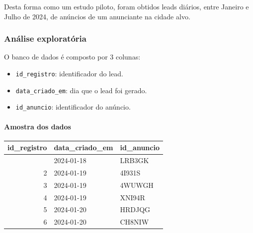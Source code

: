 \documentclass[
]{article}
\newenvironment{Shaded}{\begin{snugshade}}{\end{snugshade}}
\newcommand{\AttributeTok}[1]{\textcolor[rgb]{0.13,0.29,0.53}{#1}}
\newcommand{\FunctionTok}[1]{\textcolor[rgb]{0.13,0.29,0.53}{\textbf{#1}}}
\newcommand{\NormalTok}[1]{#1}
\newcommand{\OtherTok}[1]{\textcolor[rgb]{0.56,0.35,0.01}{#1}}
\newcommand{\SpecialCharTok}[1]{\textcolor[rgb]{0.81,0.36,0.00}{\textbf{#1}}}
\newcommand{\StringTok}[1]{\textcolor[rgb]{0.31,0.60,0.02}{#1}}
\providecommand{\tightlist}{%
  \setlength{\itemsep}{0pt}\setlength{\parskip}{0pt}}
\begin{document}
Desta forma como um estudo piloto, foram obtidos leads diários, entre
Janeiro e Julho de 2024, de anúncios de um anunciante na cidade alvo.

\subsubsection{Análise exploratória}\label{anuxe1lise-exploratuxf3ria}

O banco de dados é composto por 3 colunas:

\begin{itemize}
\tightlist
\item
  \texttt{id\_registro}: identificador do lead.
\item
  \texttt{data\_criado\_em}: dia que o lead foi gerado.
\item
  \texttt{id\_anuncio}: identificador do anúncio.
\end{itemize}

\paragraph{Amostra dos dados}\label{amostra-dos-dados}

\begin{Shaded}
\end{Shaded}

\begin{longtable}[]{@{}rll@{}}
\toprule\noalign{}
id\_registro & data\_criado\_em & id\_anuncio \\
\midrule\noalign{}
\endhead
\bottomrule\noalign{}
\endlastfoot
1 & 2024-01-18 & LRB3GK \\
2 & 2024-01-19 & 4I931S \\
3 & 2024-01-19 & 4WUWGH \\
4 & 2024-01-19 & XNI94R \\
5 & 2024-01-20 & HRDJQG \\
6 & 2024-01-20 & CH8NIW \\
\end{longtable}
\end{document}

